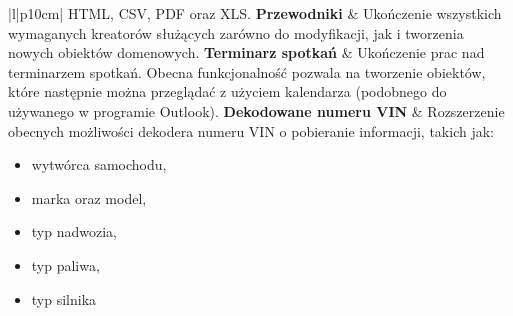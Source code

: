 \begin{center}
\begin{longtable}{|l|p{10cm}|}
		HTML, CSV, PDF oraz XLS.		
		\hline
		\textbf{Przewodniki}			&
		Ukończenie wszystkich wymaganych kreatorów służących zarówno do modyfikacji, jak i tworzenia nowych obiektów domenowych.
		\hline
		\textbf{Terminarz spotkań}		&
		Ukończenie prac nad terminarzem spotkań. Obecna funkcjonalność pozwala na tworzenie obiektów, które następnie
		można przeglądać z użyciem kalendarza (podobnego do używanego w programie Outlook). 	
		\hline
		\textbf{Dekodowane numeru VIN}		&
		Rozszerzenie obecnych możliwości dekodera numeru VIN o pobieranie informacji, takich jak:
		\begin{itemize}
			\item wytwórca samochodu,
			\item marka oraz model,
			\item typ nadwozia,
			\item typ paliwa,
			\item typ silnika
		\end{itemize}							
	\end{longtable}
\end{center}